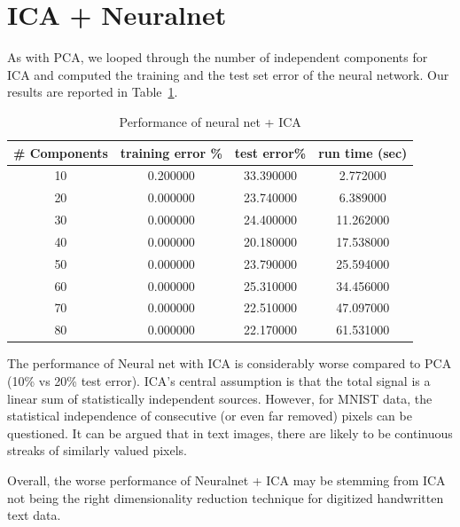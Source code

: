 \documentclass[10pt,letterpaper]{article}
\begin{document}
\section{ICA + Neuralnet}
As with PCA, we looped through the number of independent components for ICA and computed the training and the test set error of the neural network. Our results are reported in Table~\ref{icann}.
\begin{table}[tbp]
\begin{center}
    \begin{tabular}{c|c|c |c}
    \hline
    {\bf \# Components}&{\bf training error \%}&{\bf test error\%} & {\bf run time (sec)} \\ \hline
 10  & 0.200000  & 33.390000  & 2.772000\\ 
 20  & 0.000000  & 23.740000  & 6.389000\\ 
 30  & 0.000000  & 24.400000  & 11.262000\\ 
 40  & 0.000000  & 20.180000  & 17.538000\\ 
 50  & 0.000000  & 23.790000  & 25.594000\\ 
 60  & 0.000000  & 25.310000  & 34.456000\\ 
 70  & 0.000000  & 22.510000  & 47.097000\\ 
 80  & 0.000000  & 22.170000  & 61.531000 \\ \hline
    \end{tabular}
\end{center}
\caption{Performance of neural net + ICA \label{icann}}
\end{table}

The performance of Neural net with ICA is considerably worse compared to PCA (10\% vs 20\% test error). ICA's central assumption is that the total signal is a linear sum of statistically independent sources. However, for MNIST data, the statistical independence of consecutive (or even far removed) pixels can be questioned. It can be argued that in text images, there are likely to be continuous streaks of similarly valued pixels. 

Overall, the worse performance of Neuralnet + ICA may be stemming from ICA not being the right dimensionality reduction technique for digitized handwritten text data. 
\end{document}
